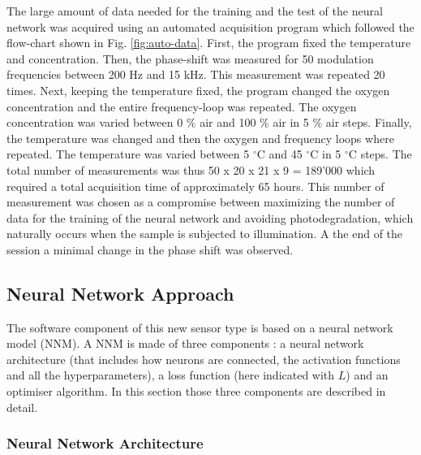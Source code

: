 \documentclass[9pt,twocolumn,twoside,pdftex]{optica}
\begin{document}
The large amount of data needed for the training and the test of the neural network was acquired using an automated acquisition program which followed the flow-chart shown in Fig. \ref{fig:auto-data}. First, the program fixed the temperature and concentration. Then, the phase-shift was measured for 50 modulation frequencies between 200 Hz and 15 kHz. This measurement was repeated 20 times. Next, keeping the temperature fixed, the program changed the oxygen concentration and the entire frequency-loop was repeated.
The oxygen concentration was varied between 0 $\%$ air and 100 $\%$ air in 5 $\%$ air steps.
Finally, the temperature was changed and then the oxygen and frequency loops where repeated. The temperature was varied between 5 $^\circ$C and 45 $^\circ$C in 5 $^\circ$C steps.
The total number of measurements was thus 50 x 20 x 21 x 9 = 189'000 which required a total acquisition time of approximately 65 hours. This number of measurement was chosen as a compromise between maximizing the number of data for the training of the neural network and avoiding photodegradation, which naturally occurs when the sample is subjected to illumination. A the end of the session a minimal change in the phase shift was observed.



\subsection{Neural Network Approach}
\label{NN}

The software component of this new sensor type is based on a neural network model (NNM). A NNM is made of three components \cite{Michelucci2017}: a neural network architecture (that includes how neurons are connected, the activation functions and all the hyperparameters), a loss function (here indicated with $L$) and an optimiser algorithm. In this section those three components are described in detail.

\subsubsection{Neural Network Architecture}
\end{document}
